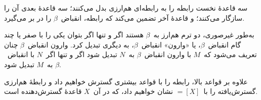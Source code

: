 \documentclass[../../../include/open-logic-section]{subfiles}
\begin{document}
سه قاعدهٔ نخست رابطه را به رابطه‌ای هم‌ارزی بدل می‌کنند؛ سه قاعدهٔ بعدی
آن را سازگار می‌کنند؛ و قاعدهٔ آخر تضمین می‌کند که رابطه، انقباض~$\beta$
را در بر می‌گیرد.

به‌طور غیرصوری، دو ترم هم‌ارز به~$\beta$ هستند اگر و تنها اگر بتوان یکی
را با صفر یا چند گام انقباض~$\beta$، یا «وارون» انقباض~$\beta$، به دیگری
تبدیل کرد. وارون انقباض~$\beta$ چنان تعریف می‌شود که~$M$ با وارون
انقباض~$\beta$ به~$N$ تبدیل شود اگر و تنها اگر~$N$ با انقباض~$\beta$
به~$M$ تبدیل شود.

علاوه بر قواعد بالا، رابطه را با قواعد بیشتری گسترش خواهیم داد و رابطهٔ
هم‌ارزی گسترش‌یافته را با~$\equal[X]$ نشان خواهیم داد، که در آن~$X$
قاعدهٔ گسترش‌دهنده است.
\end{document}
